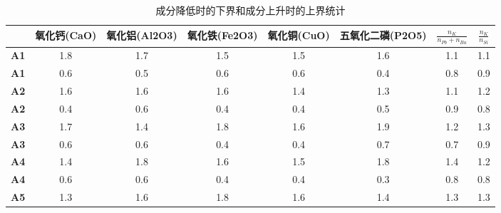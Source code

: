 \documentclass[withoutpreface,bwprint]{cumcmthesis} %
\begin{document}
\begin{table}[!h]
	\centering
	\small
	\caption{成分降低时的下界和成分上升时的上界统计}
	\label{6-3}
	\begin{tabular}{@{}cccccccc@{}}
		\toprule
		& \textbf{氧化钙(CaO)} & \textbf{氧化铝(Al2O3)} & \textbf{氧化铁(Fe2O3)} & \textbf{氧化铜(CuO)} & \textbf{五氧化二磷(P2O5)} & \textbf{$\frac{n_K}{n_{Pb}+n_{Ba}} $} & \textbf{$\frac{n_{K}}{n_{Si}} $} \\ \midrule
		\textbf{A1} & 1.8               & 1.7                 & 1.5                 & 1.5               & 1.6                  & 1.1                                   & 1.1                              \\
		\textbf{A1} & 0.6               & 0.5                 & 0.6                 & 0.6               & 0.4                  & 0.8                                   & 0.9                              \\
		\textbf{A2} & 1.6               & 1.6                 & 1.6                 & 1.4               & 1.3                  & 1.1                                   & 1.2                              \\
		\textbf{A2} & 0.4               & 0.6                 & 0.4                 & 0.4               & 0.5                  & 0.9                                   & 0.8                              \\
		\textbf{A3} & 1.7               & 1.4                 & 1.8                 & 1.6               & 1.9                  & 1.2                                   & 1.3                              \\
		\textbf{A3} & 0.6               & 0.6                 & 0.4                 & 0.4               & 0.7                  & 0.7                                   & 0.9                              \\
		\textbf{A4} & 1.4               & 1.8                 & 1.6                 & 1.5               & 1.8                  & 1.4                                   & 1.2                              \\
		\textbf{A4} & 0.6               & 0.6                 & 0.4                 & 0.4               & 0.3                  & 0.8                                   & 0.8                              \\
		\textbf{A5} & 1.3               & 1.6                 & 1.8                 & 1.6               & 1.4                  & 1.3                                   & 1.3                              \\

\end{tabular}
\end{table}
\end{document}
